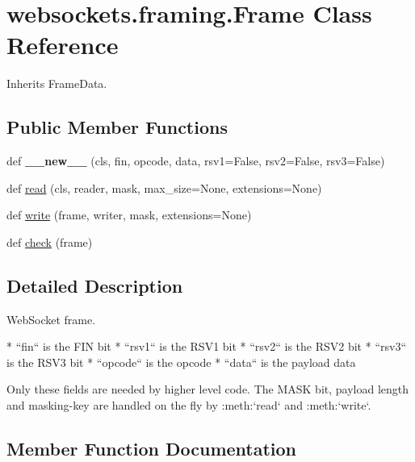 \hypertarget{classwebsockets_1_1framing_1_1_frame}{}\section{websockets.\+framing.\+Frame Class Reference}
\label{classwebsockets_1_1framing_1_1_frame}


Inherits Frame\+Data.

\subsection*{Public Member Functions}
\begin{DoxyCompactItemize}
\item 
\mbox{\label{classwebsockets_1_1framing_1_1_frame_af53c73796977e78d274a58d4b2918535}} 
def {\bfseries \+\_\+\+\_\+new\+\_\+\+\_\+} (cls, fin, opcode, data, rsv1=False, rsv2=False, rsv3=False)
\item 
def \hyperlink{classwebsockets_1_1framing_1_1_frame_ac6097dbf7626110e68e0c8b8e0211469}{read} (cls, reader, mask, max\+\_\+size=None, extensions=None)
\item 
def \hyperlink{classwebsockets_1_1framing_1_1_frame_a318a898942fe4545692eaf96da9983e9}{write} (frame, writer, mask, extensions=None)
\item 
def \hyperlink{classwebsockets_1_1framing_1_1_frame_ae92f454847a301ea56df1b8ca2df1cee}{check} (frame)
\end{DoxyCompactItemize}


\subsection{Detailed Description}
\begin{DoxyVerb}WebSocket frame.

* ``fin`` is the FIN bit
* ``rsv1`` is the RSV1 bit
* ``rsv2`` is the RSV2 bit
* ``rsv3`` is the RSV3 bit
* ``opcode`` is the opcode
* ``data`` is the payload data

Only these fields are needed by higher level code. The MASK bit, payload
length and masking-key are handled on the fly by :meth:`read` and
:meth:`write`.\end{DoxyVerb}
 

\subsection{Member Function Documentation}
\mbox{\label{classwebsockets_1_1framing_1_1_frame_ae92f454847a301ea56df1b8ca2df1cee}} 
